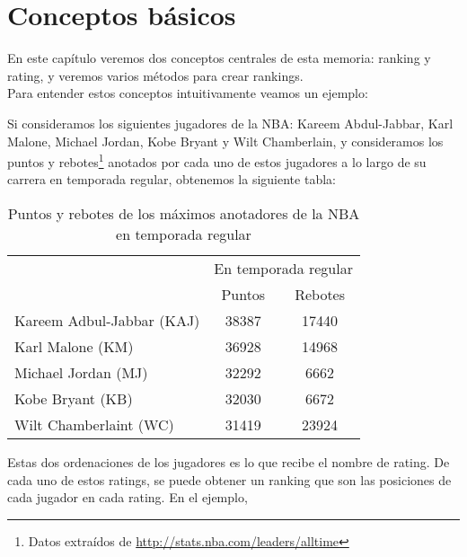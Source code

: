\chapter{Conceptos básicos}

En este capítulo veremos dos conceptos centrales de esta memoria: ranking y rating, y veremos varios métodos para crear rankings.\\

Para entender estos conceptos intuitivamente veamos un ejemplo:

\begin{ejemplo}
Si consideramos los siguientes jugadores de la NBA: Kareem Abdul-Jabbar, Karl Malone, Michael Jordan, Kobe Bryant y Wilt Chamberlain, y consideramos los puntos y rebotes\footnote{Datos extraídos de \url{http://stats.nba.com/leaders/alltime}} anotados por cada uno de estos jugadores a lo largo de su carrera en temporada regular, obtenemos la siguiente tabla:

\begin{table}[h]
\centering
\caption[Puntos y rebotes de los máximos anotadores de la NBA]{Puntos y rebotes de los máximos anotadores de la NBA en temporada regular}
\label{tbl:puntos_rebotes}
\begin{tabular}{@{}lcc@{}}
\cmidrule(l){2-3}
\multicolumn{1}{c}{}      & \multicolumn{2}{c}{En temporada regular} \\ \cmidrule(l){2-3} 
\multicolumn{1}{c}{}      & Puntos             & Rebotes             \\ \midrule
Kareem Adbul-Jabbar (KAJ) & 38387              & 17440               \\ \midrule
Karl Malone (KM)          & 36928              & 14968               \\ \midrule
Michael Jordan (MJ)       & 32292              & 6662                \\ \midrule
Kobe Bryant (KB)          & 32030              & 6672                \\ \midrule
Wilt Chamberlaint (WC)    & 31419              & 23924               \\ \bottomrule
\end{tabular}
\end{table}

Estas dos ordenaciones de los jugadores es lo que recibe el nombre de rating. De cada uno de estos ratings, se puede obtener un ranking que son las posiciones de cada jugador en cada rating. En el ejemplo,


\end{ejemplo}
